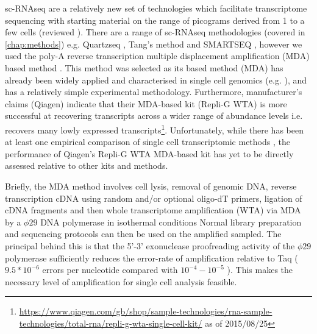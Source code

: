 sc-RNAseq are a relatively new set of technologies which facilitate transcriptome sequencing with starting material on the range of picograms
derived from 1 to a few cells (reviewed \citep{Macaulay2014,Liang2014,Wu2014a}).  There are a range of sc-RNAseq methodologies 
(covered in \ref{chap:methods}) e.g. Quartzseq \citep{Sasagawa2013}, Tang's method \citep{Tang2009} and SMARTSEQ \citep{Goetz2012,Picelli2014},
however we used the poly-A reverse transcription multiple displacement amplification (MDA) based method \citep{Korfhage2015}.  
This method was selected as its based method (MDA) has already been widely applied and characterised in single cell genomics (e.g. \citep{Spits2006}),
and has a relatively simple experimental methodology.  Furthermore, manufacturer's claims (Qiagen) indicate that their MDA-based kit (Repli-G WTA) 
is more successful at recovering transcripts across a wider range of abundance levels i.e. recovers many lowly expressed transcripts\footnote{
\url{https://www.qiagen.com/gb/shop/sample-technologies/rna-sample-technologies/total-rna/repli-g-wta-single-cell-kit/} as of 2015/08/25}.
Unfortunately, while there has been at least one empirical comparison of single cell transcriptomic methods \citep{Wu2014a}, the performance of
Qiagen's Repli-G WTA MDA-based kit has yet to be directly assessed relative to other kits and methods. 

Briefly, the MDA method involves cell lysis, removal of genomic DNA, reverse transcription cDNA using random and/or optional oligo-dT 
primers, ligation of cDNA fragments and then whole transcriptome amplification (WTA) via MDA by a \(\phi29\) DNA polymerase in isothermal conditions \citep{Korfhage2015}
Normal library preparation and sequencing protocols can then be used on the amplified sampled.  
The principal behind this is that the 5'-3' exonuclease proofreading activity of the \(\phi29\) polymerase sufficiently reduces
the error-rate of amplification relative to Taq (\(9.5*10^{-6}\) errors per nucleotide \citep{Paez2004} compared with
\(10^{-4}-10^{-5}\) \citep{Tindall1988,Eckert1990}).  This makes the necessary level of amplification
for single cell analysis feasible.




